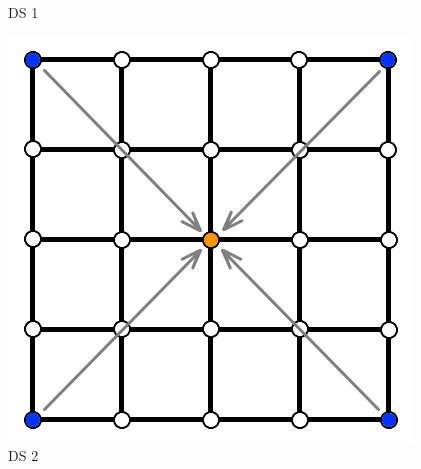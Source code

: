 \documentclass[11pt,a4paper,twoside,openright]{report}
\begin{document}
\begin{figure}[!htb]
  \caption{DS 1}\label{fig:ds1}
\endminipage\hfill
{}%
  \includegraphics[width=\linewidth]{ds2.png}
  \caption{DS 2}\label{fig:ds2}
\endminipage
\end{figure}
\end{document}
